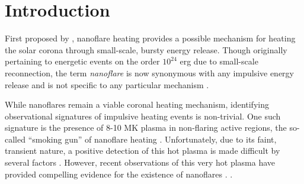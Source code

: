 \section{Introduction}\label{introduction}


 First proposed by \citet{parker_nanoflares_1988}, nanoflare heating provides a possible mechanism for heating the solar corona through small-scale, bursty energy release. Though originally pertaining to energetic events on the order $10^{24}$ erg due to small-scale reconnection, the term \textit{nanoflare} is now synonymous with any impulsive energy release and is not specific to any particular mechanism \citep{klimchuk_key_2015}. 


While nanoflares remain a viable coronal heating mechanism, identifying observational signatures of impulsive heating events is non-trivial. One such signature is the presence of 8-10 MK plasma in non-flaring active regions, the so-called ``smoking gun'' of nanoflare heating \citep{cargill_implications_1994}. Unfortunately, due to its faint, transient nature, a positive detection of this hot plasma is made difficult by several factors \citep{winebarger_defining_2012,barnes_inference_2016}. However, recent observations of this very hot plasma have provided compelling evidence for the existence of nanoflares \citep[e.g.][]{reale_evidence_2009,schmelz_hinode_2009,testa_hinode/eis_2012,brosius_pervasive_2014,caspi_new_2015,parenti_spectroscopy_2017,ishikawa_detection_2017}. .

